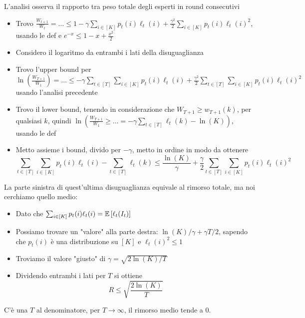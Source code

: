 L'analisi osserva il rapporto tra peso totale degli esperti in round consecutivi
\begin{itemize}
    \item Trovo $\frac{W_{t+1}}{W_t} = \dots \leq 1 - \gamma \sum_{i \in [K]} p_t (i) \ell_t (i) + \frac{\gamma^2}{2} \sum_{i \in [K]} p_t(i) \ell_t(i)^2$, usando le def e $e^{-x} \leq 1 - x + \frac{x^2}{2}$

    \item Considero il logaritmo da entrambi i lati della disuguaglianza

    \item Trovo l'upper bound per $\ln \left(\frac{W_{T+1}}{W_1}\right) = \dots \leq - \gamma \sum_{t \in [T]} \sum_{i \in [K]} p_t(i) \ell_t (i) + \frac{\gamma^2}{2} \sum_{t \in [T]} \sum_{i \in [K]} p_t (i) \ell_t (i)^2$ usando l'analisi precedente

    \item Trovo il lower bound, tenendo in considerazione che $W_{T+1} \geq w_{T+1}(k)$, per qualsiasi $k$, quindi $\ln \left(\frac{W_{T+1}}{W_1} \geq \dots = - \gamma \sum_{t \in [T]} \ell_t (k) - \ln (K) \right)$, usando le def

    \item Metto assieme i bound, divido per $- \gamma$, metto in ordine in modo da ottenere
    \[ \sum_{t \in [T]} \sum_{i \in [K]} p_t (i) \ell_t (i) - \sum_{t \in [T]} \ell_t (k) \leq \frac{\ln (K)}{\gamma} + \frac{\gamma}{2} \sum_{t \in [T]} \sum_{i \in [K]} p_t (i) \ell_t (i)^2 \tag{\dag} \]
\end{itemize}

La parte sinistra di quest'ultima disuguaglianza equivale al rimorso totale, ma noi cerchiamo quello medio:
\begin{itemize}
    \item Dato che $\sum_{i \in [K]} p_t (i) \ell_t (i) = \mathbb{E} \left[\ell_t (I_t)\right]$

    \item Possiamo trovare un "valore" alla parte destra: $\ln(K)/\gamma + \gamma T/2$, sapendo che $p_t(i)$ è una distribuzione su $[K]$ e $\ell_t(i)^2 \leq 1$

    \item Troviamo il valore "giusto" di $\gamma = \sqrt{2 \ln (K)/T}$

    \item Dividendo entrambi i lati per $T$ si ottiene
    $$ R \leq \sqrt{\frac{2 \ln (K)}{T}} $$
\end{itemize}
C'è una $T$ al denominatore, per $T \rightarrow \infty$, il rimorso medio tende a $0$.

